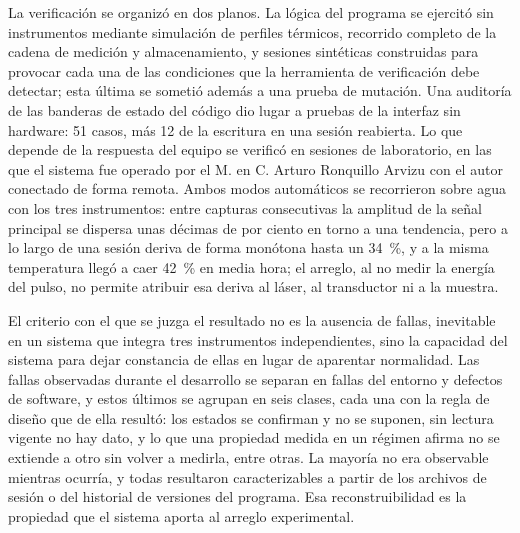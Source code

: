 La verificación se organizó en dos planos. La lógica del programa se
ejercitó sin instrumentos mediante simulación de perfiles térmicos,
recorrido completo de la cadena de medición y almacenamiento, y
sesiones sintéticas construidas para provocar cada una de las
condiciones que la herramienta de verificación debe detectar; esta
última se sometió además a una prueba de mutación. Una auditoría de las
banderas de estado del código dio lugar a pruebas de la interfaz sin
hardware: 51 casos, más 12 de la escritura en una sesión reabierta. Lo
que depende de la respuesta del equipo se verificó en sesiones de
laboratorio, en las que el sistema fue operado por el M. en C. Arturo
Ronquillo Arvizu con el autor conectado de forma remota. Ambos modos
automáticos se recorrieron sobre agua con los tres instrumentos: entre
capturas consecutivas la amplitud de la señal principal se dispersa unas
décimas de por ciento en torno a una tendencia, pero a lo largo de una
sesión deriva de forma monótona hasta un \SI{34}{\percent}, y a la misma
temperatura llegó a caer \SI{42}{\percent} en media hora; el arreglo, al
no medir la energía del pulso, no permite atribuir esa deriva al láser,
al transductor ni a la muestra.

El criterio con el que se juzga el resultado no es la ausencia de
fallas, inevitable en un sistema que integra tres instrumentos
independientes, sino la capacidad del sistema para dejar constancia de
ellas en lugar de aparentar normalidad. Las fallas observadas durante el
desarrollo se separan en fallas del entorno y defectos de software, y
estos últimos se agrupan en seis clases, cada una con la regla de
diseño que de ella resultó: los estados se confirman y no se suponen,
sin lectura vigente no hay dato, y lo que una propiedad medida en un
régimen afirma no se extiende a otro sin volver a medirla, entre otras.
La mayoría no era observable mientras ocurría, y todas resultaron
caracterizables a partir de los archivos de sesión o del historial de
versiones del programa. Esa reconstruibilidad es la propiedad que el
sistema aporta al arreglo experimental.
